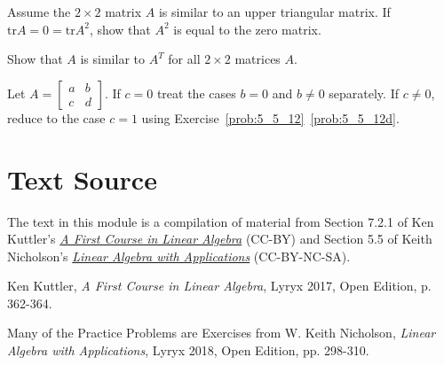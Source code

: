 \documentclass{ximera}
\begin{document}
\begin{problem}
Assume the $2 \times 2$ matrix $A$ is similar to an upper triangular matrix. If $\mbox{tr} A = 0 = \mbox{tr} A^{2}$, show that $A^{2}$ is equal to the zero matrix.
\end{problem}

\begin{problem}
Show that $A$ is similar to $A^{T}$ for all $2 \times 2$ matrices $A$. 
\begin{hint}
Let $A =\begin{bmatrix}
a & b \\
c & d
\end{bmatrix}$. If $c = 0$ treat the cases $b = 0$ and $b \neq 0$ separately. If $c \neq 0$, reduce to the case $c = 1$ using Exercise~\ref{prob:5_5_12}~\ref{prob:5_5_12d}.
\end{hint}
\end{problem}

\section*{Text Source}
The text in this module is a compilation of material from Section 7.2.1 of Ken Kuttler's \href{https://open.umn.edu/opentextbooks/textbooks/a-first-course-in-linear-algebra-2017}{\it A First Course in Linear Algebra} (CC-BY) and Section 5.5 of Keith Nicholson's \href{https://open.umn.edu/opentextbooks/textbooks/linear-algebra-with-applications}{\it Linear Algebra with Applications} (CC-BY-NC-SA).

Ken Kuttler, {\it  A First Course in Linear Algebra}, Lyryx 2017, Open Edition, p. 362-364.

Many of the Practice Problems are Exercises from 
W. Keith Nicholson, {\it Linear Algebra with Applications}, Lyryx 2018, Open Edition, pp. 298-310.
\end{document}
